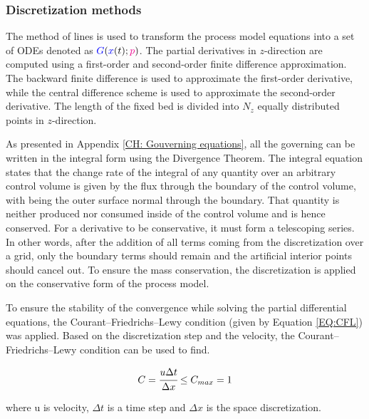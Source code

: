 \documentclass[../Article_Model_Parameters.tex]{subfiles}
\begin{document}
			\subsubsection{Discretization methods}
			
			The method of lines is used to transform the process model equations into a set of ODEs denoted as ${\color{blue}G}({\color{blue}x}(t);{\color{magenta}p})$. The partial derivatives in $z$-direction are computed using a first-order and second-order finite difference approximation. The backward finite difference is used to approximate the first-order derivative, while the central difference scheme is used to approximate the second-order derivative. The length of the fixed bed is divided into $N_z$ equally distributed points in $z$-direction. 
			
			As presented in Appendix \ref{CH: Gouverning equations}, all the governing can be written in the integral form using the Divergence Theorem. The integral equation states that the change rate of the integral of any quantity over an arbitrary control volume is given by the flux through the boundary of the control volume, with being the outer surface normal through the boundary. That quantity is neither produced nor consumed inside of the control volume and is hence conserved. For a derivative to be conservative, it must form a telescoping series. In other words, after the addition of all terms coming from the discretization over a grid, only the boundary terms should remain and the artificial interior points should cancel out. To ensure the mass conservation, the discretization is applied on the conservative form of the process model.
			
			To ensure the stability of the convergence while solving the partial differential equations, the Courant–Friedrichs–Lewy condition (given by Equation \ref{EQ:CFL}) was applied. Based on the discretization step and the velocity, the Courant–Friedrichs–Lewy condition can be used to find.
			
			{\footnotesize
				\begin{equation}
					C = \cfrac{u\Delta t}{\Delta x} \leq C_{max} = 1 
					\label{EQ:CFL}
				\end{equation}
			}
			
			where u is velocity, $\Delta t$	is a time step and $\Delta x$ is the space discretization.
			
\end{document}
